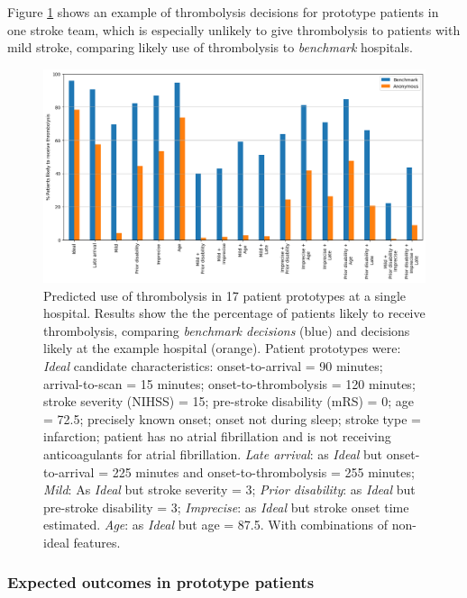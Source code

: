 Figure \ref{fig:thrombolysis_rates_prototype_patients_team_x} shows an example of thrombolysis decisions for prototype patients in one stroke team, which is especially unlikely to give thrombolysis to patients with mild stroke, comparing likely use of thrombolysis to \textit{benchmark} hospitals.

\begin{figure}
    \centering
    \includegraphics[width=1\linewidth]{images/prototype_patients_team_x.png}
    \caption{Predicted use of thrombolysis in 17 patient prototypes at a single hospital. Results show the the percentage of patients likely to receive thrombolysis, comparing \textit{benchmark decisions} (blue) and decisions likely at the example hospital (orange). Patient prototypes were: \textit{Ideal} candidate characteristics: onset-to-arrival = 90 minutes; arrival-to-scan = 15 minutes; onset-to-thrombolysis = 120 minutes; stroke severity (NIHSS) = 15; pre-stroke disability (mRS) = 0; age = 72.5; precisely known onset; onset not during sleep; stroke type = infarction; patient has no atrial fibrillation and is not receiving anticoagulants for atrial fibrillation. \textit{Late arrival}: as \textit{Ideal} but onset-to-arrival = 225 minutes and onset-to-thrombolysis = 255 minutes; \textit{Mild}: As \textit{Ideal} but stroke severity = 3; \textit{Prior disability}: as \textit{Ideal} but pre-stroke disability = 3; \textit{Imprecise}: as \textit{Ideal} but stroke onset time estimated. \textit{Age}: as \textit{Ideal} but age = 87.5. With combinations of non-ideal features.}
    \label{fig:thrombolysis_rates_prototype_patients_team_x}
\end{figure}


\subsubsection{Expected outcomes in prototype patients}

